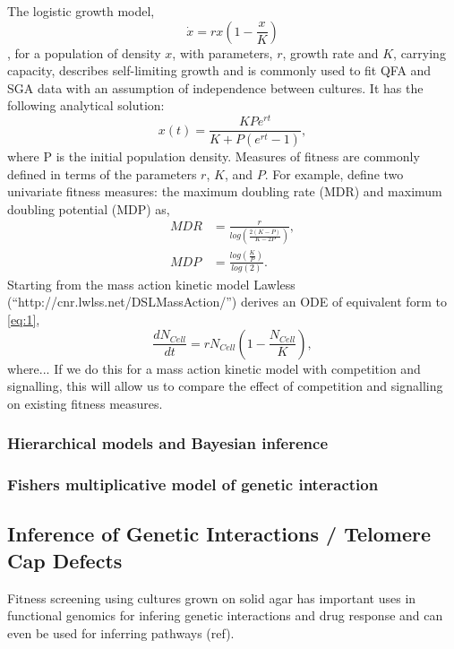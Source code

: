 \begin{multicols}{2}
The logistic growth model,
\begin{equation}
  \label{eq:1}
  \dot{x} = rx\left(1 - \frac{x}{K}\right)
\end{equation}
\citep{Verhulst1845}, for a population of density \(x\), with parameters, \(r\), growth
rate and \(K\), carrying capacity, describes self-limiting growth and is commonly used
to fit QFA and SGA data with an assumption of independence between cultures. It has the
following analytical solution:
\begin{equation}
  \label{eq:2}
  x(t) = \frac{KPe^{rt}}{K + P(e^{rt}-1)},
\end{equation}
where P is the initial population density. Measures of fitness are commonly defined in
terms of the parameters \(r\), \(K\), and \(P\). For example, \cite{Addinall2011} define two univariate
fitness measures: the maximum doubling rate (MDR) and maximum doubling potential (MDP) as,
\begin{subequations}
  \label{eq:3}
    \begin{align}
      MDR &= \frac{r}{log\left(\frac{2(K-P)}{K-2P}\right)},\\
      MDP &= \frac{log\left(\frac{K}{P}\right)}{log(2)}.
    \end{align}
\end{subequations}
Starting from the mass action kinetic model Lawless (``http://cnr.lwlss.net/DSLMassAction/'')
derives an ODE of equivalent form to \ref{eq:1},
\begin{equation}
  \label{eq:8}
  \frac{dN_{Cell}}{dt} = rN_{Cell}\left(1 - \frac{N_{Cell}}{K}\right),
\end{equation}
where...  If we do this for a mass action kinetic model with competition and signalling,
this will allow us to compare the effect of competition and signalling on existing fitness
measures.


\subsubsection{Hierarchical models and Bayesian inference}
\subsubsection{Fishers multiplicative model of genetic interaction}
\subsection{Inference of Genetic Interactions / Telomere Cap Defects}
\label{sec:genetic-interaction}
Fitness screening using cultures grown on solid agar has important uses in functional
genomics for infering genetic interactions and drug response and can even be used for
inferring pathways (ref).


\end{multicols}
